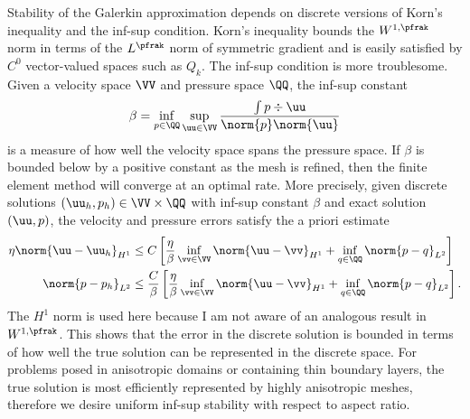 Stability of the Galerkin approximation depends on discrete versions of Korn's inequality and the inf-sup condition.
Korn's inequality bounds the $W^{1,\pfrak}$ norm in terms of the $L^\pfrak$ norm of symmetric gradient and is easily satisfied by $C^0$ vector-valued spaces such as $Q_k$.
The inf-sup condition is more troublesome.
Given a velocity space $\VV$ and pressure space $\QQ$, the inf-sup constant
\begin{equation}\label{eq:slip:inf-sup}
  \beta = \inf_{p\in \QQ} \sup_{\uu\in\VV} \frac{\int p\div\uu}{\norm{p} \norm{\uu}}
\end{equation}
is a measure of how well the velocity space spans the pressure space.
If $\beta$ is bounded below by a positive constant as the mesh is refined, then the finite element method will converge at an optimal rate.
More precisely, given discrete solutions $(\uu_h,p_h) \in \VV \times \QQ$ with inf-sup constant $\beta$ and exact solution $(\uu,p)$, the velocity and pressure errors satisfy the a priori estimate~\citep{brezzi1991mixed}
\begin{subequations}\label{eq:slip:apriori}
\begin{align}
  \eta \norm{\uu - \uu_h}_{H^1} & \le C \left[ \frac{\eta}{\beta} \inf_{\vv \in \VV} \norm{\uu - \vv}_{H^1} + \inf_{q \in \QQ} \norm{p-q}_{L^2} \right] \\
  \norm{p - p_h}_{L^2} & \le \frac{C}{\beta} \left[ \frac{\eta}{\beta} \inf_{\vv \in \VV} \norm{\uu - \vv}_{H^1} + \inf_{q\in\QQ} \norm{p-q}_{L^2} \right] .
\end{align}
\end{subequations}
The $H^1$ norm is used here because I am not aware of an analogous result in $W^{1,\pfrak}$.
This shows that the error in the discrete solution is bounded in terms of how well the true solution can be represented in the discrete space.
For problems posed in anisotropic domains or containing thin boundary layers, the true solution is most efficiently represented by highly anisotropic meshes, therefore we desire uniform inf-sup stability with respect to aspect ratio.

